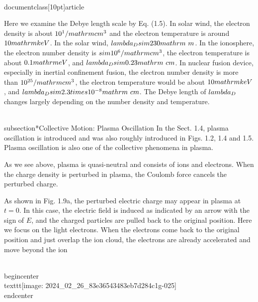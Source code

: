 \\documentclass[10pt]{article}
\begin{document}
Here we examine the Debye length scale by Eq. (1.5). In solar wind, the electron density is about $10^{1} / \\mathrm{cm}^{3}$ and the electron temperature is around $10 \\mathrm{keV}$. In the solar wind, $\\lambda_{D} \\sim 230 \\mathrm{~m}$. In the ionosphere, the electron number density is $\\sim 10^{6} / \\mathrm{cm}^{3}$, the electron temperature is about $0.1 \\mathrm{eV}$, and $\\lambda_{D} \\sim 0.23 \\mathrm{~cm}$. In nuclear fusion device, especially in inertial confinement fusion, the electron number density is more than $10^{25} / \\mathrm{cm}^{3}$, the electron temperature would be about $10 \\mathrm{keV}$, and $\\lambda_{D} \\sim 2.3 \\times 10^{-8} \\mathrm{~cm}$. The Debye length of $\\lambda_{D}$ changes largely depending on the number density and temperature.

\\subsection*{Collective Motion: Plasma Oscillation}
In the Sect. 1.4, plasma oscillation is introduced and was also roughly introduced in Figs. 1.2, 1.4 and 1.5. Plasma oscillation is also one of the collective phenomena in plasma.

As we see above, plasma is quasi-neutral and consists of ions and electrons. When the charge density is perturbed in plasma, the Coulomb force cancels the perturbed charge.

As shown in Fig. 1.9a, the perturbed electric charge may appear in plasma at $t=0$. In this case, the electric field is induced as indicated by an arrow with the sign of $E$, and the charged particles are pulled back to the original position. Here we focus on the light electrons. When the electrons come back to the original position and just overlap the ion cloud, the electrons are already accelerated and move beyond the ion

\\begin{center}
\\texttt{[image: 2024\_02\_26\_83e36543483eb7d284c1g-025]}
\\end{center}
\end{document}
